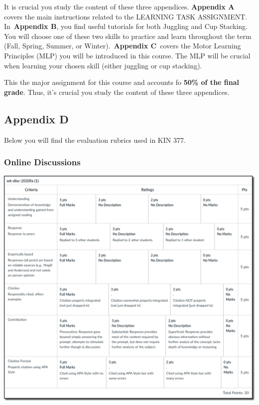 \documentclass[
  letterpaper,
  DIV=11,
  numbers=noendperiod,
  oneside]{scrartcl}
\begin{document}
It is crucial you study the content of these three appendices.
\textbf{Appendix A} covers the main instructions related to the LEARNING
TASK ASSIGNMENT. In~\textbf{Appendix B}, you find useful tutorials for
both Juggling and Cup Stacking. You will choose one of these two skills
to practice and learn throughout the term (Fall, Spring, Summer, or
Winter).~\textbf{Appendix C}~covers the Motor Learning Principles (MLP)
you will be introduced in this course. The MLP will be crucial when
learning your chosen skill (either juggling or cup stacking).

This the major assignment for this course and accounts fo \textbf{50\%
of the final grade}. Thus, it's crucial you study the content of these
three appendices.

\hypertarget{appendix-d}{%
\subsection{Appendix D}\label{appendix-d}}

Below you will find the evaluation rubrics used in KIN 377.

\hypertarget{online-discussions-1}{%
\subsubsection{Online Discussions}\label{online-discussions-1}}

\includegraphics{images/paste-CCDC1445.png}
\end{document}
